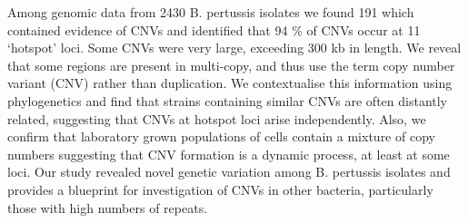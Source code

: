 \documentclass{article}
\begin{document}
Among genomic data from 2430 B. pertussis isolates we found 191 which contained evidence of CNVs and identified that 94 \% of CNVs occur at 11 ‘hotspot’ loci. Some CNVs were very large, exceeding 300 kb in length. We reveal that some regions are present in multi-copy, and thus use the term copy number variant (CNV) rather than duplication. We contextualise this information using phylogenetics and find that strains containing similar CNVs are often distantly related, suggesting that CNVs at hotspot loci arise independently. Also, we confirm that laboratory grown populations of cells contain a mixture of copy numbers suggesting that CNV formation is a dynamic process, at least at some loci. Our study revealed novel genetic variation among B. pertussis isolates and provides a blueprint for investigation of CNVs in other bacteria, particularly those with high numbers of repeats.
\end{document}

